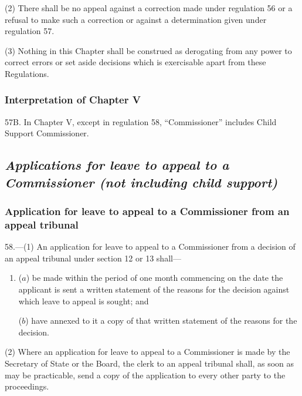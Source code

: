 \documentclass[12pt,a4paper]{article}
\begin{document}
(2) There shall be no appeal against a correction made under regulation 56 or a refusal to make such a correction or against a determination given under regulation 57.

(3) Nothing in this Chapter shall be construed as derogating from any power to correct errors or set aside decisions which is exercisable apart from these Regulations.


\subsubsection[57B. Interpretation of Chapter V]{Interpretation of Chapter V}

57B.  In Chapter V, except in regulation 58, “Commissioner” includes Child Support Commissioner.


\subsection{\itshape Applications for leave to appeal to a Commissioner (not including child support)}

\subsubsection[58. Application for leave to appeal to a Commissioner from an appeal tribunal]{Application for leave to appeal to a Commissioner from an appeal tribunal}

58.—(1) An application for leave to appeal to a Commissioner from a decision of an appeal tribunal under section 12 or 13 shall—
\begin{enumerate}\item[]
($a$) be made within the period of one month commencing on the date the applicant is sent a written statement of the reasons for the decision against which leave to appeal is sought; and

($b$) have annexed to it a copy of that written statement of the reasons for the decision.
\end{enumerate}

(2) Where an application for leave to appeal to a Commissioner is made by the Secretary of State
or the Board,  %
the clerk to an appeal tribunal shall, as soon as may be practicable, send a copy of the application to every other party to the proceedings.
\end{document}
